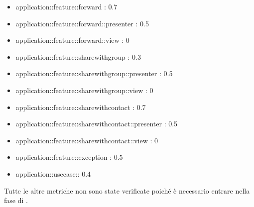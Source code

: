 \begin{itemize}
\item application::feature::forward : 0.7
\item application::feature::forward::presenter : 0.5
\item application::feature::forward::view : 0
\item application::feature::sharewithgroup : 0.3
\item application::feature::sharewithgroup::presenter : 0.5
\item application::feature::sharewithgroup::view : 0
\item application::feature::sharewithcontact : 0.7
\item application::feature::sharewithcontact::presenter : 0.5
\item application::feature::sharewithcontact::view : 0
\item application::feature::exception : 0.5
\item application::usecase:: 0.4

\end{itemize}

Tutte le altre metriche non sono state verificate poiché è necessario entrare nella fase di \COD.
